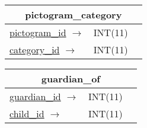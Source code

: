 \vspace{10pt}

\begin{tabular}{|l|l|c|}
\hline
\multicolumn{3}{|c|}{pictogram\_category} \\
\hline
\underline{pictogram\_id} $ \rightarrow $ & INT(11) & \\
\underline{category\_id} $ \rightarrow $ & INT(11) & \\
\hline
\end{tabular}

\vspace{10pt}

\begin{tabular}{|l|l|c|}
\hline
\multicolumn{3}{|c|}{guardian\_of} \\
\hline
\underline{guardian\_id} $ \rightarrow $ & INT(11) & \\
\underline{child\_id} $ \rightarrow $ & INT(11) & \\
\hline
\end{tabular}

\vspace{10pt}